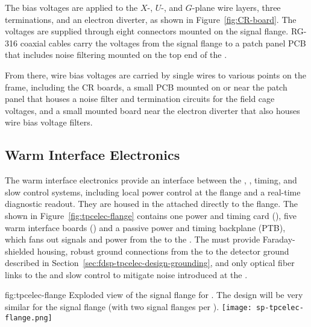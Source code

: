 The bias voltages are applied to the $X$-, $U$-, and $G$-plane wire layers, three  terminations, 
and an electron diverter, as shown in Figure~\ref{fig:CR-board}. The voltages are supplied 
through eight  connectors mounted on the signal flange. RG-316 coaxial cables carry the voltages 
from the signal flange to a patch panel PCB that includes noise filtering mounted on the top 
end of the . 

From there, wire bias voltages are carried by single wires to 
various points on the  frame, including the CR boards, a small PCB mounted on or near 
the patch panel that houses a noise filter and termination circuits for the field cage voltages, and 
a small mounted board near the electron diverter that also houses wire bias voltage filters.

\subsection{Warm Interface Electronics}
\label{sec:fdsp-tpcelec-design-warm}

The warm interface electronics provide an interface between the , , timing, and slow control systems, including local power control at the flange and a real-time diagnostic readout. They are housed in the  attached directly to the  flange.  The  shown in Figure~\ref{fig:tpcelec-flange} contains one power and timing card (), five warm interface boards () and a passive power and timing backplane (PTB), which fans out signals and  power from the  to the . The  must provide Faraday-shielded housing, robust ground connections from the  to the detector ground described in Section~\ref{sec:fdsp-tpcelec-design-grounding}, and only optical fiber links to the  and slow control to mitigate noise introduced at the  \fdth.

\begin{dunefigure}
{fig:tpcelec-flange}
{Exploded view of the  signal flange for .  The design will be very similar for the   signal flange (with two  signal flanges per \fdth).}
\texttt{[image: sp-tpcelec-flange.png]}
\end{dunefigure}

